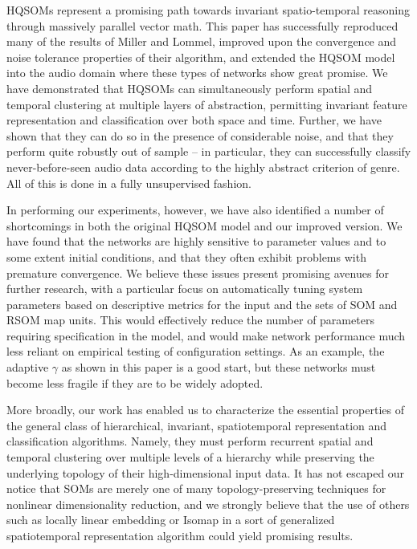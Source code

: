 \documentclass[a4paper,10pt]{article}
\begin{document}
HQSOMs represent a promising path towards invariant spatio-temporal reasoning through massively
parallel vector math. This paper has successfully reproduced many of the results of Miller and
Lommel, improved upon the convergence and noise tolerance properties of their algorithm, and
extended the HQSOM model into the audio domain where these types of networks show great promise. We
have demonstrated that HQSOMs can simultaneously perform spatial and temporal clustering at multiple
layers of abstraction, permitting invariant feature representation and classification over both
space and time. Further, we have shown that they can do so in the presence of considerable noise,
and that they perform quite robustly out of sample -- in particular, they can successfully classify
never-before-seen audio data according to the highly abstract criterion of genre. All of this is
done in a fully unsupervised fashion.

In performing our experiments, however, we have also identified a number of shortcomings in both the
original HQSOM model and our improved version. We have found that the networks are highly sensitive
to parameter values and to some extent initial conditions, and that they often exhibit problems with
premature convergence. We believe these issues present promising avenues for further research, with
a particular focus on automatically tuning system parameters based on descriptive metrics for the
input and the sets of SOM and RSOM map units. This would effectively reduce the number of parameters
requiring specification in the model, and would make network performance much less reliant on
empirical testing of configuration settings. As an example, the adaptive $\gamma$ as shown in this
paper is a good start, but these networks must become less fragile if they are to be widely adopted.

More broadly, our work has enabled us to characterize the essential properties of the general class
of hierarchical, invariant, spatiotemporal representation and classification algorithms. Namely,
they must perform recurrent spatial and temporal clustering over multiple levels of a hierarchy
while preserving the underlying topology of their high-dimensional input data. It has not escaped
our notice that SOMs are merely one of many topology-preserving techniques for nonlinear
dimensionality reduction, and we strongly believe that the use of others such as locally linear
embedding or Isomap in a sort of generalized spatiotemporal representation algorithm could yield
promising results.
\end{document}
